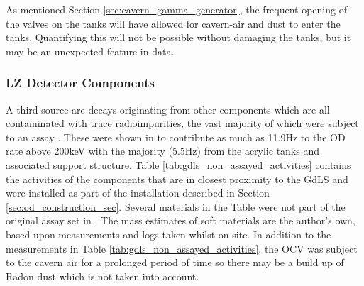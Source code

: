 \par
As mentioned Section \ref{sec:cavern_gamma_generator}, the frequent opening of the valves on the tanks will have allowed for cavern-air and dust to enter the tanks.
Quantifying this  will not be possible without damaging the tanks, but it may be an unexpected feature in data.

\subsubsection{LZ Detector Components}
\par
A third source are decays originating from other components which are all contaminated with trace radioimpurities, the vast majority of which were subject to an assay \cite{LZ_assay_ref}.
These were shown in \cite{scotthaselschwardt_thesis_ref} to contribute as much as 11.9Hz to the OD rate above 200keV with the majority (5.5Hz) from the acrylic tanks and associated support structure.
Table \ref{tab:gdls_non_assayed_activities} contains the activities of the components that are in closest proximity to the GdLS and were installed as part of the installation described in Section \ref{sec:od_construction_sec}.
Several materials in the Table were not part of the original assay set in \cite{LZ_assay_ref}.
The mass estimates of soft materials are the author's own, based upon measurements and logs taken whilst on-site.
In addition to the measurements in Table \ref{tab:gdls_non_assayed_activities}, the OCV was subject to the cavern air for a prolonged period of time so there may be a build up of Radon dust which is not taken into account.

